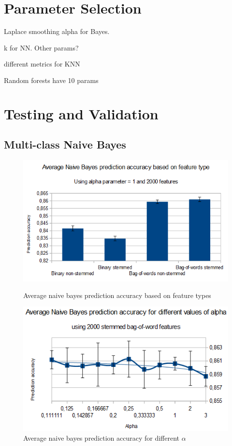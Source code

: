\documentclass{acm_proc_article-sp}
\begin{document}
\section{Parameter Selection}
Laplace smoothing alpha for Bayes.

k for NN. Other params?

different metrics for KNN

Random forests have 10 params 

\newpage
\section{Testing and Validation}
\subsection{Multi-class Naive Bayes}
\begin{figure} 
\includegraphics[width=1\columnwidth]{images/nb_feature_types.png}  \label{fig:n1}
\caption{Average naive bayes prediction accuracy based on feature types}
\end{figure}

\begin{figure}
\includegraphics[width=1\columnwidth]{images/nb_alpha.png}  
\caption{Average naive bayes prediction accuracy for different $\alpha$} \label{fig:n2}
\end{figure}
\end{document}
